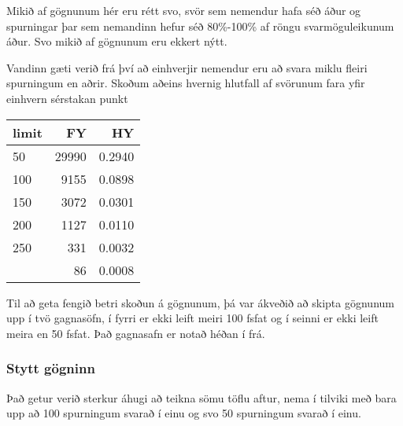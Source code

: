 \documentclass[
  12pt,
]{article}
\begin{document}
Mikið af gögnunum hér eru rétt svo, svör sem nemendur hafa séð áður og spurningar þar sem nemandinn hefur séð 80\%-100\% af röngu svarmöguleikunum áður. Svo mikið af gögnunum eru ekkert nýtt.

Vandinn gæti verið frá því að einhverjir nemendur eru að svara miklu fleiri spurningum en aðrir. Skoðum aðeins hvernig hlutfall af svörunum fara yfir einhvern sérstakan punkt

\begin{table}[H]
\centering
\begin{tabular}{lrr}
\toprule
limit & FY & HY\\
\midrule
50 & 29990 & 0.2940\\
100 & 9155 & 0.0898\\
150 & 3072 & 0.0301\\
200 & 1127 & 0.0110\\
250 & 331 & 0.0032\\
\addlinespace
300 & 86 & 0.0008\\
\bottomrule
\end{tabular}
\end{table}

Til að geta fengið betri skoðun á gögnunum, þá var ákveðið að skipta gögnunum upp í tvö gagnasöfn, í fyrri er ekki leift meiri 100 fsfat og í seinni er ekki leift meira en 50 fsfat. Það gagnasafn er notað héðan í frá.

\hypertarget{stytt-guxf6gninn}{%
\subsubsection{Stytt gögninn}\label{stytt-guxf6gninn}}

Það getur verið sterkur áhugi að teikna sömu töflu aftur, nema í tilviki með bara upp að 100 spurningum svarað í einu og svo 50 spurningum svarað í einu.
\end{document}
